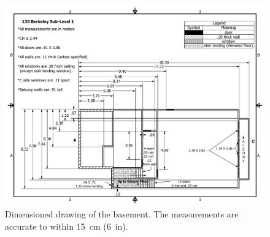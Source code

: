 \documentclass[12pt,oneside]{book}
\begin{document}
\begin{figure}[!ht]
\includegraphics[width=6.5in]{../Figures/Sub_Level_1_Metric}
\caption[Dimensioned drawing of the basement.]{Dimensioned drawing of the basement. The measurements are accurate to within 15~cm (6~in).}
\label{fig:drawing_basement}
\end{figure}
\end{document}
